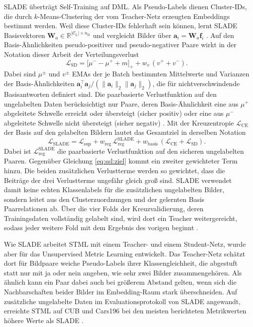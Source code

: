 \ac{SLADE} überträgt Self-Training auf \ac{DML}. Als Pseudo-Labels dienen Cluster-IDs, die durch $k$-Means-Clustering der vom Teacher-Netz erzeugten Embeddings bestimmt werden. Weil diese Cluster-IDs fehlerhaft sein können, lernt \ac{SLADE} Basisvektoren $\bm{W}_a\in\mathbb{R}^{|\mathcal{C}_{\mathrm{L}}|\times n_{\mathrm{D}}}$ und vergleicht Bilder über $\bm{a}_i=\bm{W}_a\bm{f}_i$ \cite{duan_slade_2021}. Auf den Basis-Ähnlichkeiten pseudo-positiver und pseudo-negativer Paare wirkt in der Notation dieser Arbeit der Verteilungsverlust \cite{duan_slade_2021}
\begin{equation}
  \mathcal{L}_{\mathrm{SD}}=\bigl[\mu^{-}-\mu^{+}+m\bigr]_+ +w_v\,(v^{+}+v^{-}).
  \label{eq:slade-sd}
\end{equation}
Dabei sind $\mu^{\pm}$ und $v^{\pm}$ \acp{EMA} der je Batch bestimmten Mittelwerte und Varianzen der Basis-Ähnlichkeiten $\bm{a}_i^{\top}\bm{a}_j/(\lVert\bm{a}_i\rVert_2\lVert\bm{a}_j\rVert_2)$, die für nichtverschwindende Basisantworten definiert sind. Die paarbasierte Verlustfunktion auf den ungelabelten Daten berücksichtigt nur Paare, deren Basis-Ähnlichkeit eine aus $\mu^{+}$ abgeleitete Schwelle erreicht oder übersteigt (sicher positiv) oder eine aus $\mu^{-}$ abgeleitete Schwelle nicht übersteigt (sicher negativ) \cite{duan_slade_2021}. Mit der Kreuzentropie $\mathcal{L}_{\mathrm{CE}}$ der Basis auf den gelabelten Bildern lautet das Gesamtziel in derselben Notation \cite{duan_slade_2021}
\begin{equation}
  \mathcal{L}_{\mathrm{SLADE}}=\mathcal{L}_{\mathrm{sup}}+w_{\mathrm{reg}}\,\mathcal{L}_{\mathrm{reg}}^{\mathrm{SLADE}}+w_{\mathrm{basis}}\,(\mathcal{L}_{\mathrm{CE}}+\mathcal{L}_{\mathrm{SD}}).
  \label{eq:slade}
\end{equation}
Dabei ist $\mathcal{L}_{\mathrm{reg}}^{\mathrm{SLADE}}$ die paarbasierte Verlustfunktion auf den sicheren ungelabelten Paaren. Gegenüber Gleichung \eqref{eq:ssl:ziel} kommt ein zweiter gewichteter Term hinzu. Die beiden zusätzlichen Verlustterme werden so gewichtet, dass die Beiträge der drei Verlustterme ungefähr gleich groß sind. \ac{SLADE} verwendet damit keine echten Klassenlabels für die zusätzlichen ungelabelten Bilder, sondern leitet aus den Clusterzuordnungen und der gelernten Basis Paarrelationen ab. Über die vier Folds der Kreuzvalidierung, deren Trainingsdaten vollständig gelabelt sind, wird dort ein Teacher weitergereicht, sodass jeder weitere Fold mit dem Ergebnis des vorigen beginnt \cite{duan_slade_2021}.

Wie \ac{SLADE} arbeitet \ac{STML} mit einem Teacher- und einem Student-Netz, wurde aber für das Unsupervised Metric Learning entwickelt. Das Teacher-Netz schätzt dort für Bildpaare weiche Pseudo-Labels ihrer Klassengleichheit, die abgestuft statt nur mit ja oder nein angeben, wie sehr zwei Bilder zusammengehören. Als ähnlich kann ein Paar dabei auch bei größerem Abstand gelten, wenn sich die Nachbarschaften beider Bilder im Embedding-Raum stark überschneiden. Auf zusätzliche ungelabelte Daten im Evaluationsprotokoll von \ac{SLADE} angewandt, erreichte \ac{STML} auf \ac{CUB} und Cars196 bei den meisten berichteten Metrikwerten höhere Werte als \ac{SLADE} \cite{kim_self-taught_2022}. 

